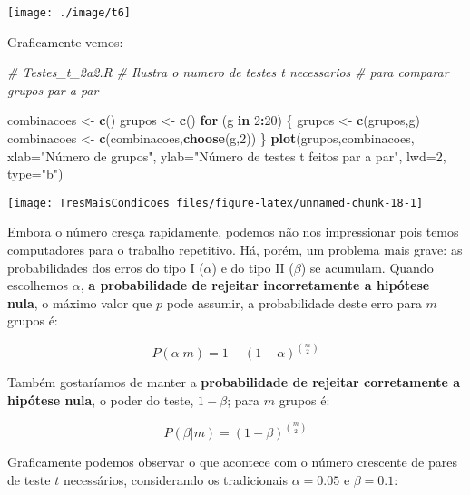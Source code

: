 \documentclass[]{article}
\newenvironment{Shaded}{\begin{snugshade}}{\end{snugshade}}
\newcommand{\KeywordTok}[1]{\textcolor[rgb]{0.13,0.29,0.53}{\textbf{#1}}}
\newcommand{\DataTypeTok}[1]{\textcolor[rgb]{0.13,0.29,0.53}{#1}}
\newcommand{\DecValTok}[1]{\textcolor[rgb]{0.00,0.00,0.81}{#1}}
\newcommand{\StringTok}[1]{\textcolor[rgb]{0.31,0.60,0.02}{#1}}
\newcommand{\CommentTok}[1]{\textcolor[rgb]{0.56,0.35,0.01}{\textit{#1}}}
\newcommand{\ControlFlowTok}[1]{\textcolor[rgb]{0.13,0.29,0.53}{\textbf{#1}}}
\newcommand{\OperatorTok}[1]{\textcolor[rgb]{0.81,0.36,0.00}{\textbf{#1}}}
\newcommand{\NormalTok}[1]{#1}
\begin{document}
\begin{center}\texttt{[image: ./image/t6]} \end{center}

Graficamente vemos:

\begin{Shaded}
\begin{Highlighting}[]
\CommentTok{# Testes_t_2a2.R}
\CommentTok{# Ilustra o numero de testes t necessarios}
\CommentTok{# para comparar grupos par a par}

\NormalTok{combinacoes <-}\StringTok{ }\KeywordTok{c}\NormalTok{()}
\NormalTok{grupos <-}\StringTok{ }\KeywordTok{c}\NormalTok{()}
\ControlFlowTok{for}\NormalTok{ (g }\ControlFlowTok{in} \DecValTok{2}\OperatorTok{:}\DecValTok{20}\NormalTok{)}
\NormalTok{\{}
\NormalTok{  grupos <-}\StringTok{ }\KeywordTok{c}\NormalTok{(grupos,g)}
\NormalTok{  combinacoes <-}\StringTok{ }\KeywordTok{c}\NormalTok{(combinacoes,}\KeywordTok{choose}\NormalTok{(g,}\DecValTok{2}\NormalTok{))}
\NormalTok{\}}
\KeywordTok{plot}\NormalTok{(grupos,combinacoes,}
     \DataTypeTok{xlab=}\StringTok{"Número de grupos"}\NormalTok{,}
     \DataTypeTok{ylab=}\StringTok{"Número de testes t feitos par a par"}\NormalTok{,}
     \DataTypeTok{lwd=}\DecValTok{2}\NormalTok{,}
     \DataTypeTok{type=}\StringTok{"b"}\NormalTok{)}
\end{Highlighting}
\end{Shaded}

\begin{center}\texttt{[image: TresMaisCondicoes\_files/figure-latex/unnamed-chunk-18-1]} \end{center}

Embora o número cresça rapidamente, podemos não nos impressionar pois
temos computadores para o trabalho repetitivo. Há, porém, um problema
mais grave: as probabilidades dos erros do tipo I (\(\alpha\)) e do tipo
II (\(\beta\)) se acumulam. Quando escolhemos \(\alpha\), \textbf{a
probabilidade de rejeitar incorretamente a hipótese nula}, o máximo
valor que \(p\) pode assumir, a probabilidade deste erro para \(m\)
grupos é:

\[P(\alpha | m) = 1-(1-\alpha)^{m \choose 2}\]

Também gostaríamos de manter a \textbf{probabilidade de rejeitar
corretamente a hipótese nula}, o poder do teste, \(1-\beta\); para \(m\)
grupos é:

\[P(\beta | m) = (1-\beta) ^ {m \choose 2}\]

Graficamente podemos observar o que acontece com o número crescente de
pares de teste \(t\) necessários, considerando os tradicionais
\(\alpha=0.05\) e \(\beta=0.1\):
\end{document}
